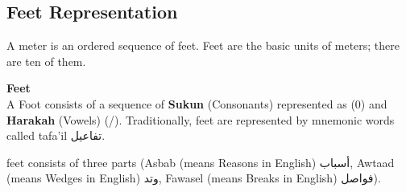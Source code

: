     
    
    \subsection{Feet Representation}
    A meter is an ordered sequence of feet. Feet are the basic
units of meters; there are ten of them.
\begin{definition}\label{def:feet}
  \textbf{Feet} \hfill \\  A Foot consists of
a sequence of \textbf{Sukun} (Consonants) represented as (0) and \textbf{Harakah} (Vowels) (/). Traditionally, feet are represented by mnemonic words called tafa’il \textarabic{تفاعيل}.
\end{definition}

feet consists of three parts (Asbab (means Reasons in English) \textarabic{أسباب}, Awtaad (means Wedges in English) \textarabic{وتد}, Fawasel (means Breaks in English) \textarabic{فواصل}).
